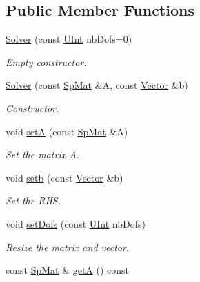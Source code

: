 \subsection*{Public Member Functions}
\begin{DoxyCompactItemize}
\item 
\hyperlink{classFVCode3D_1_1Solver_ae06a2b1c559b33c8e4a29b29949f487c}{Solver} (const \hyperlink{namespaceFVCode3D_a4bf7e328c75d0fd504050d040ebe9eda}{U\+Int} nb\+Dofs=0)
\begin{DoxyCompactList}\small\item\em Empty constructor. \end{DoxyCompactList}\item 
\hyperlink{classFVCode3D_1_1Solver_a124a4c7681a041398cdfbdb2c1868b82}{Solver} (const \hyperlink{namespaceFVCode3D_ac1032289d96638cf0ad6c52ef639095f}{Sp\+Mat} \&A, const \hyperlink{namespaceFVCode3D_a16ccf345652402bccd1a5d2e6782526c}{Vector} \&b)
\begin{DoxyCompactList}\small\item\em Constructor. \end{DoxyCompactList}\item 
void \hyperlink{classFVCode3D_1_1Solver_acb124b4e7a3497ba9abe46ce0eea9a26}{setA} (const \hyperlink{namespaceFVCode3D_ac1032289d96638cf0ad6c52ef639095f}{Sp\+Mat} \&A)
\begin{DoxyCompactList}\small\item\em Set the matrix A. \end{DoxyCompactList}\item 
void \hyperlink{classFVCode3D_1_1Solver_a6dc18b11079fb7efcac042f030e63885}{setb} (const \hyperlink{namespaceFVCode3D_a16ccf345652402bccd1a5d2e6782526c}{Vector} \&b)
\begin{DoxyCompactList}\small\item\em Set the R\+HS. \end{DoxyCompactList}\item 
void \hyperlink{classFVCode3D_1_1Solver_a23e97439c26cf3e473393bad01eea32a}{set\+Dofs} (const \hyperlink{namespaceFVCode3D_a4bf7e328c75d0fd504050d040ebe9eda}{U\+Int} nb\+Dofs)
\begin{DoxyCompactList}\small\item\em Resize the matrix and vector. \end{DoxyCompactList}\item 
const \hyperlink{namespaceFVCode3D_ac1032289d96638cf0ad6c52ef639095f}{Sp\+Mat} \& \hyperlink{classFVCode3D_1_1Solver_a4e0d62a458ca50e58a8ada34b1a54fff}{getA} () const 

\end{DoxyCompactItemize}
